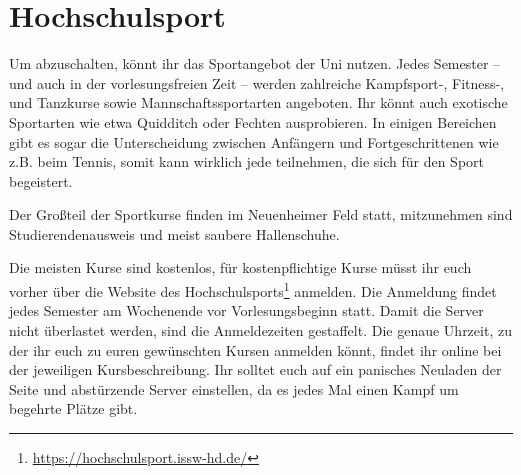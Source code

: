 \section{Hochschulsport}
Um abzuschalten, könnt ihr das Sportangebot der Uni nutzen. Jedes Semester -- und auch in der vorlesungsfreien Zeit -- werden zahlreiche Kampfsport-, Fitness-, und Tanzkurse sowie Mannschaftssportarten angeboten. Ihr könnt auch exotische Sportarten wie etwa Quidditch oder Fechten ausprobieren. In einigen Bereichen gibt es sogar die Unterscheidung zwischen Anfängern und Fortgeschrittenen wie z.B. beim Tennis, somit kann wirklich jede teilnehmen, die sich für den Sport begeistert.

Der Großteil der Sportkurse finden im Neuenheimer Feld statt, mitzunehmen sind Studierendenausweis und meist saubere Hallenschuhe.

Die meisten Kurse sind kostenlos, für kostenpflichtige Kurse müsst ihr euch vorher über die Website des Hochschulsports\footnote{\url{https://hochschulsport.issw-hd.de/}} anmelden. Die Anmeldung findet jedes Semester am Wochenende vor Vorlesungsbeginn statt. Damit die Server nicht überlastet werden, sind die Anmeldezeiten gestaffelt. Die genaue Uhrzeit, zu der ihr euch zu euren gewünschten Kursen anmelden könnt, findet ihr online bei der jeweiligen Kursbeschreibung. Ihr solltet euch auf ein panisches Neuladen der Seite und abstürzende Server einstellen, da es jedes Mal einen Kampf um begehrte Plätze gibt.
